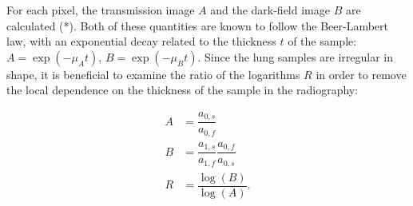 For each pixel, the transmission image $A$ and the
dark-field image $B$ are calculated (*). Both of these
quantities are known to follow the Beer-Lambert law, with an exponential
decay related to the thickness $t$ of the sample: $A = \exp(-\mu_A t)$, $B =
\exp(-\mu_B t)$. Since the lung samples are irregular in shape, it is
beneficial to examine the ratio of the logarithms $R$ in
order to remove the local dependence on the thickness of the sample in the
radiography:

\begin{align*}
    A &= \dfrac{a_{0,s}}{a_{0,f}}\\
    B &= \dfrac{a_{1,s}}{a_{1,f}}\dfrac{a_{0,f}}{a_{0,s}}\\
    R &= \dfrac{\log(B)}{\log(A)}.
    \label{eqn:definitions}
\end{align*}

